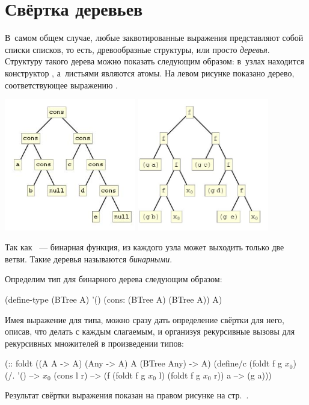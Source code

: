 \section[2]{Свёртка деревьев}%
В~самом общем случае, любые заквотированные выражения представляют собой списки списков, то есть, древообразные структуры, или просто \emph{деревья}. Структуру такого дерева можно показать следующим образом: в~узлах находится конструктор , а~листьями являются атомы. На левом рисунке показано дерево, соответствующее выражению .
\begin{center}\label{fig:tree}
  \includegraphics[width=0.43\textwidth]{../figures/tree1.jpg}
  \qquad
  \includegraphics[width=0.43\textwidth]{../figures/tree4.jpg}
\end{center}

Так как ~--- бинарная функция, из каждого узла может выходить только две ветви. Такие деревья называются \emph{бинарными}. 

Определим тип для бинарного дерева следующим образом:
\begin{Definition}
(define-type (BTree A)
  '()
  (cons: (BTree A) (BTree A))
  A)
\end{Definition}

Имея выражение для типа, можно сразу дать определение свёртки для него, описав, что делать с каждым слагаемым, и организуя рекурсивные вызовы для рекурсивных множителей в произведении типов:
\begin{Definition}[emph={f,g,a,l,r}]
(:: foldt ((A A -> A) (Any -> A) A (BTree Any) -> A)
 (define/c (foldt f g $x_0$)
   (/. '() --> $x_0$
       (cons l r) --> (f (foldt f g $x_0$ l) 
                        (foldt f g $x_0$ r))
       a --> (g a)))
\end{Definition}
Результат свёртки выражения  показан на правом рисунке на стр.~\pageref{fig:tree}.

